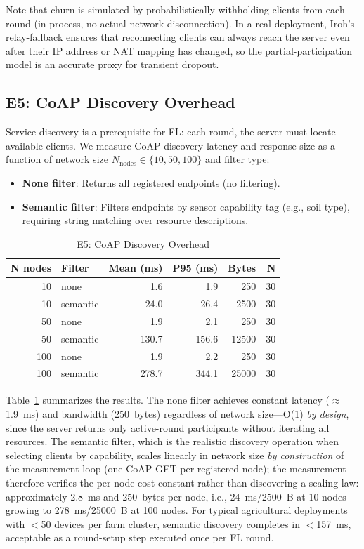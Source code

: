﻿\documentclass[journal]{IEEEtran}
\begin{document}
Note that churn is simulated by probabilistically withholding clients from each round (in-process, no actual network disconnection). In a real deployment, Iroh's relay-fallback ensures that reconnecting clients can always reach the server even after their IP address or NAT mapping has changed, so the partial-participation model is an accurate proxy for transient dropout.

\subsection{E5: CoAP Discovery Overhead}
\label{sec:e5}

Service discovery is a prerequisite for FL: each round, the server must locate available clients. We measure CoAP discovery latency and response size as a function of network size $N_{\text{nodes}} \in \{10, 50, 100\}$ and filter type:

\begin{itemize}
    \item \textbf{None filter}: Returns all registered endpoints (no filtering).
    \item \textbf{Semantic filter}: Filters endpoints by sensor capability tag (e.g., soil type), requiring string matching over resource descriptions.
\end{itemize}

\begin{table}[t]
\centering
\caption{E5: CoAP Discovery Overhead}
\label{tab:e5}
\footnotesize
\begin{tabular}{r l r r r r}
\toprule
\textbf{N nodes} & \textbf{Filter} & \textbf{Mean (ms)} & \textbf{P95 (ms)} & \textbf{Bytes} & \textbf{N} \\
\midrule
10  & none     & 1.6  & 1.9  & 250   & 30 \\
10  & semantic & 24.0 & 26.4 & 2500  & 30 \\
50  & none     & 1.9  & 2.1  & 250   & 30 \\
50  & semantic & 130.7 & 156.6 & 12500 & 30 \\
100 & none     & 1.9  & 2.2  & 250   & 30 \\
100 & semantic & 278.7 & 344.1 & 25000 & 30 \\
\bottomrule
\end{tabular}
\end{table}

Table~\ref{tab:e5} summarizes the results. The none filter achieves constant latency ($\approx$1.9~ms) and bandwidth (250~bytes) regardless of network size---O(1) \emph{by design}, since the server returns only active-round participants without iterating all resources. The semantic filter, which is the realistic discovery operation when selecting clients by capability, scales linearly in network size \emph{by construction} of the measurement loop (one CoAP GET per registered node); the measurement therefore verifies the per-node cost constant rather than discovering a scaling law: approximately 2.8~ms and 250~bytes per node, i.e., 24~ms/2500~B at 10 nodes growing to 278~ms/25000~B at 100 nodes. For typical agricultural deployments with $<$50 devices per farm cluster, semantic discovery completes in $<$157~ms, acceptable as a round-setup step executed once per FL round.
\end{document}
